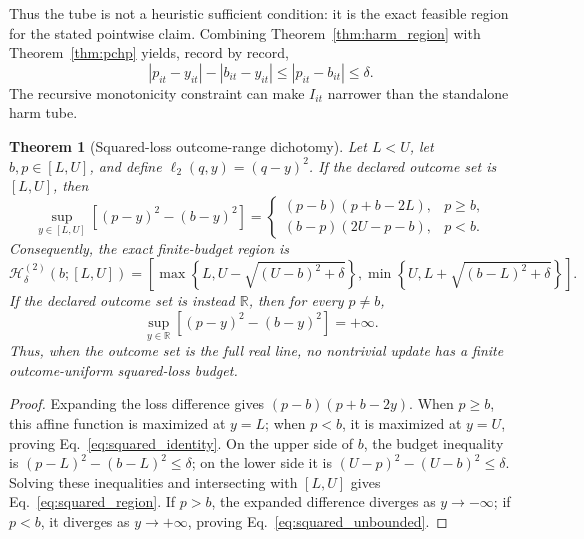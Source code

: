 \documentclass[11pt]{article}
\newtheorem{theorem}{Theorem}
\newcommand{\R}{\mathbb{R}}
\begin{document}
Thus the tube is not a heuristic sufficient condition: it is the exact feasible region for the stated pointwise claim. Combining Theorem~\ref{thm:harm_region} with Theorem~\ref{thm:pchp} yields, record by record,
\begin{equation}
  |p_{it}-y_{it}|-|b_{it}-y_{it}|
  \leq |p_{it}-b_{it}|\leq\delta.
  \label{eq:pointwise_harm}
\end{equation}
The recursive monotonicity constraint can make $I_{it}$ narrower than the standalone harm tube.

\begin{theorem}[Squared-loss outcome-range dichotomy]
\label{thm:squared_geometry}
Let $L<U$, let $b,p\in[L,U]$, and define $\ell_2(q,y)=(q-y)^2$. If the declared outcome set is $[L,U]$, then
\begin{equation}
  \sup_{y\in[L,U]}\left[(p-y)^2-(b-y)^2\right]
  =
  \begin{cases}
    (p-b)(p+b-2L), & p\geq b,\\
    (b-p)(2U-p-b), & p<b.
  \end{cases}
  \label{eq:squared_identity}
\end{equation}
Consequently, the exact finite-budget region is
\begin{equation}
  \mathcal H^{(2)}_{\delta}(b;[L,U])
  =\left[
  \max\!\left\{L,U-\sqrt{(U-b)^2+\delta}\right\},
  \min\!\left\{U,L+\sqrt{(b-L)^2+\delta}\right\}
  \right].
  \label{eq:squared_region}
\end{equation}
If the declared outcome set is instead $\R$, then for every $p\neq b$,
\begin{equation}
  \sup_{y\in\R}\left[(p-y)^2-(b-y)^2\right]=+\infty.
  \label{eq:squared_unbounded}
\end{equation}
Thus, when the outcome set is the full real line, no nontrivial update has a finite outcome-uniform squared-loss budget.
\end{theorem}
\begin{proof}
Expanding the loss difference gives $(p-b)(p+b-2y)$. When $p\geq b$, this affine function is maximized at $y=L$; when $p<b$, it is maximized at $y=U$, proving Eq.~\eqref{eq:squared_identity}. On the upper side of $b$, the budget inequality is $(p-L)^2-(b-L)^2\leq\delta$; on the lower side it is $(U-p)^2-(U-b)^2\leq\delta$. Solving these inequalities and intersecting with $[L,U]$ gives Eq.~\eqref{eq:squared_region}. If $p>b$, the expanded difference diverges as $y\to-\infty$; if $p<b$, it diverges as $y\to+\infty$, proving Eq.~\eqref{eq:squared_unbounded}.
\end{proof}
\end{document}
